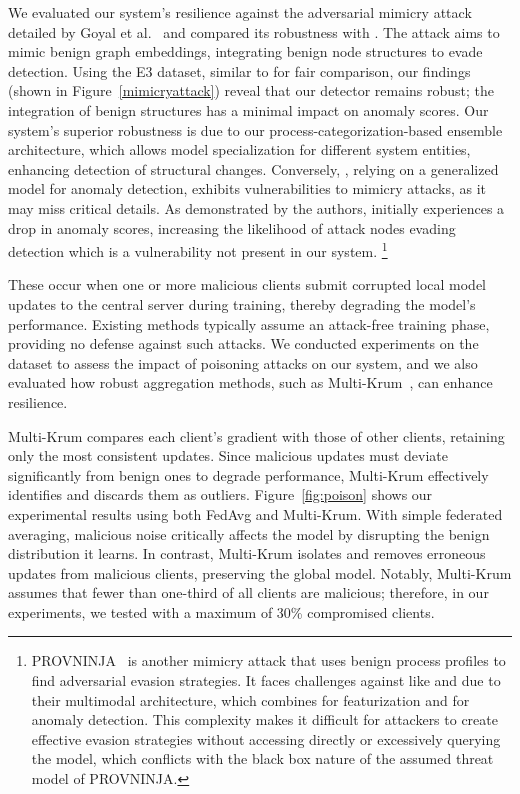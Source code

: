   We evaluated our system's resilience against the adversarial mimicry attack detailed by Goyal et al.~\cite{goyal2023sometimes} and compared its robustness with \flash. The attack aims to mimic benign graph embeddings, integrating benign node structures to evade detection. Using the E3 dataset, similar to \flash for fair comparison, our findings (shown in Figure~\ref{mimicryattack}) reveal that our detector remains robust; the integration of benign structures has a minimal impact on anomaly scores. Our system's superior robustness is due to our process-categorization-based ensemble \gnnshort architecture, which allows model specialization for different system entities, enhancing detection of structural changes. Conversely, \flash, relying on a generalized model for anomaly detection, exhibits vulnerabilities to mimicry attacks, as it may miss critical details. As demonstrated by the authors, \flash initially experiences a drop in anomaly scores, increasing the likelihood of attack nodes evading detection which is a vulnerability not present in our system. \footnote{PROVNINJA~\cite{mukherjee2023evading} is another mimicry attack that uses benign process profiles to find adversarial evasion strategies. It faces challenges against \pids like \flash and \Sys due to their multimodal architecture, which combines \wordvec for featurization and \gnnshort for anomaly detection. This complexity makes it difficult for attackers to create effective evasion strategies without accessing \wordvec directly or excessively querying the model, which conflicts with the black box nature of the assumed threat model of PROVNINJA.}


 These occur when one or more malicious clients submit corrupted local model updates to the central server during training, thereby degrading the model’s performance. Existing methods typically assume an attack-free training phase, providing no defense against such attacks. We conducted experiments on the \optc dataset to assess the impact of poisoning attacks on our system, and we also evaluated how robust aggregation methods, such as Multi-Krum~\cite{munoz2019byzantine}, can enhance resilience.

Multi-Krum compares each client’s gradient with those of other clients, retaining only the most consistent updates. Since malicious updates must deviate significantly from benign ones to degrade performance, Multi-Krum effectively identifies and discards them as outliers. Figure~\ref{fig:poison} shows our experimental results using both FedAvg and Multi-Krum. With simple federated averaging, malicious noise critically affects the model by disrupting the benign distribution it learns. In contrast, Multi-Krum isolates and removes erroneous updates from malicious clients, preserving the global model. Notably, Multi-Krum assumes that fewer than one-third of all clients are malicious; therefore, in our experiments, we tested with a maximum of 30\% compromised clients.



